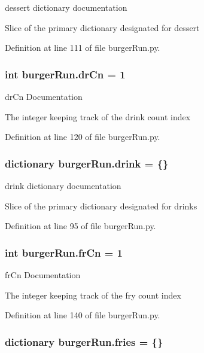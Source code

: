 dessert dictionary documentation 

Slice of the primary dictionary designated for dessert 

Definition at line 111 of file burger\-Run.\-py.

\hypertarget{namespaceburgerRun_a019b962825d9a82c89de805f650dee76}{
\subsubsection[{dr\-Cn}]{\setlength{\rightskip}{0pt plus 5cm}int burger\-Run.\-dr\-Cn = 1}}\label{namespaceburgerRun_a019b962825d9a82c89de805f650dee76}


dr\-Cn Documentation 

The integer keeping track of the drink count index 

Definition at line 120 of file burger\-Run.\-py.

\hypertarget{namespaceburgerRun_a84be9e321bb63d3d40da9e0bf52e507b}{
\subsubsection[{drink}]{\setlength{\rightskip}{0pt plus 5cm}dictionary burger\-Run.\-drink = \{\}}}\label{namespaceburgerRun_a84be9e321bb63d3d40da9e0bf52e507b}


drink dictionary documentation 

Slice of the primary dictionary designated for drinks 

Definition at line 95 of file burger\-Run.\-py.

\hypertarget{namespaceburgerRun_a65f61b21a29714e8920d8206a185d8ce}{
\subsubsection[{fr\-Cn}]{\setlength{\rightskip}{0pt plus 5cm}int burger\-Run.\-fr\-Cn = 1}}\label{namespaceburgerRun_a65f61b21a29714e8920d8206a185d8ce}


fr\-Cn Documentation 

The integer keeping track of the fry count index 

Definition at line 140 of file burger\-Run.\-py.

\hypertarget{namespaceburgerRun_a0be2ba67e70fc76bc84437dce00ca082}{
\subsubsection[{fries}]{\setlength{\rightskip}{0pt plus 5cm}dictionary burger\-Run.\-fries = \{\}}}\label{namespaceburgerRun_a0be2ba67e70fc76bc84437dce00ca082}


